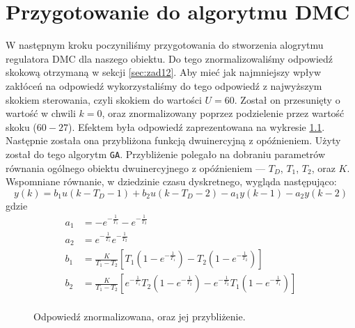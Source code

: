 \chapter{Przygotowanie do algorytmu DMC}
W następnym kroku poczyniliśmy przygotowania do stworzenia alogrytmu regulatora
DMC dla naszego obiektu. Do tego znormalizowaliśmy odpowiedź skokową otrzymaną
w sekcji \ref{sec:zad12}. Aby mieć jak najmniejszy wpływ zakłóceń na odpowiedź
wykorzystaliśmy do tego odpowiedź z najwyższym skokiem sterowania, czyli
skokiem do wartości $U = 60$. Został on przesunięty o wartość w chwili $k = 0$,
oraz znormalizowany poprzez podzielenie przez wartość skoku ($60 - 27$).
Efektem była odpowiedź zaprezentowana na wykresie \ref{fig:odp_dmc}.
Następnie została ona przybliżona funkcją dwuinercyjną z opóźnieniem.
Użyty został do tego algorytm \texttt{GA}.
Przybliżenie polegało na dobraniu parametrów równania ogólnego obiektu
dwuinercyjnego z opóźnieniem --- $T_D$, $T_1$, $T_2$, oraz $K$. Wspomniane
równanie, w dziedzinie czasu dyskretnego, wygląda następująco:
\begin{equation}
  y(k) = b_1u(k - T_D - 1) + b_2u(k-T_D-2)-a_1y(k-1)-a_2y(k-2)
\end{equation}
gdzie
\begin{align}
  a_1 &= -e^{-\frac{1}{T_1}}-e^{-\frac{1}{T_2}} \nonumber \\
  a_2 &= e^{-\frac{1}{T_1}}e^{-\frac{1}{T_2}} \nonumber \\
  b_1 &= \frac{K}{T_1 - T_2}[T_1(1-e^{-\frac{1}{T_1}}) - T_2(1 - e^{-\frac{1}{T_2}})] \nonumber \\
  b_2 &= \frac{K}{T_1 - T_2}[e^{-\frac{1}{T_1}}T_2(1-e^{-\frac{1}{T_2}}) - e^{-\frac{1}{T_2}}T_1(1-e^{-\frac{1}{T_1}})] \nonumber \\
\end{align}

\begin{figure}[tb]
\centering
{}
\caption{Odpowiedź znormalizowana, oraz jej przybliżenie.}
\label{fig:odp_dmc}
\end{figure}
